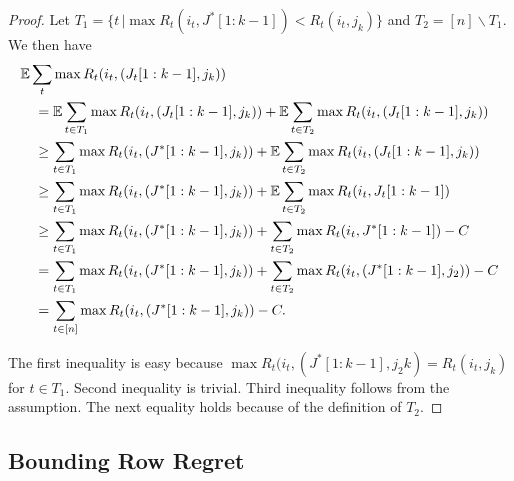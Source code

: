 \begin{proof}
 Let $T_1 = \{ t \, | \max R_t(i_t,J^*[1:k-1]) < R_t(i_t,j_k) \}$ and $T_2 = [n] \backslash T_1 .$ We then have 
\begin{align*}
  & \mathbb{E} \sum_t \max R_t(i_t,(J_t[1:k-1],j_k)) \\
  & \quad = \mathbb{E}\sum_{t \in T_1} \max R_t(i_t,(J_t[1:k-1],j_k)) + \mathbb{E}\sum_{t \in T_2} \max R_t(i_t,(J_t[1:k-1],j_k)) \\
  & \quad \geq \sum_{t \in T_1} \max R_t(i_t,(J^*[1:k-1],j_k)) + \mathbb{E}\sum_{t \in T_2} \max R_t(i_t,(J_t[1:k-1],j_k)) \\
  & \quad \geq \sum_{t \in T_1} \max R_t(i_t,(J^*[1:k-1],j_k)) + \mathbb{E}\sum_{t \in T_2} \max R_t(i_t,J_t[1:k-1]) \\
  & \quad \geq \sum_{t \in T_1} \max R_t(i_t,(J^*[1:k-1],j_k)) + \sum_{t \in T_2} \max R_t(i_t,J^*[1:k-1]) - C \\
  & \quad = \sum_{t \in T_1} \max R_t(i_t,(J^*[1:k-1],j_k)) + \sum_{t \in T_2} \max R_t(i_t,(J^*[1:k-1],j_2)) - C \\
  & \quad = \sum_{t \in [n]} \max R_t(i_t,(J^*[1:k-1],j_k)) - C.
\end{align*}

The first inequality is easy because $\max R_t(i_t,(J^*[1:k-1],j_2k) = R_t(i_t,j_k)$ for $t \in T_1$. Second inequality is trivial. Third inequality follows from the assumption. The next equality holds because of the definition of $T_2$.  
\end{proof}


\subsection{Bounding Row Regret}


